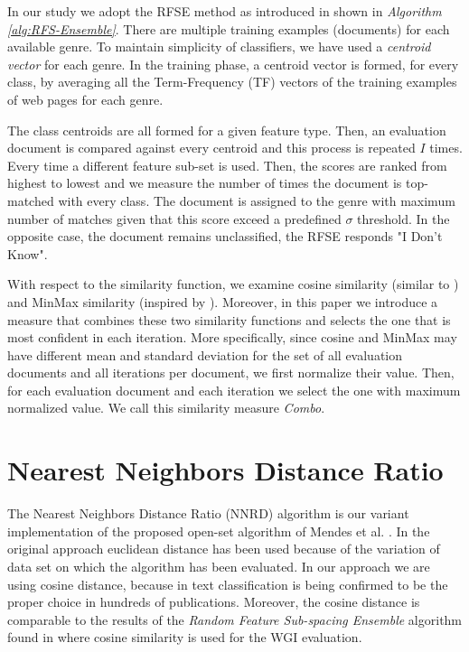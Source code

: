 \hfill \break

In our study we adopt the RFSE method as introduced in  shown in \textit{Algorithm \ref{alg:RFS-Ensemble}}. There are multiple training examples (documents) for each available genre. To maintain simplicity of classifiers, we have used a \textit{centroid vector} for each genre. In the training phase, a centroid vector is formed, for every class, by averaging all the Term-Frequency (TF) vectors of the training examples of web pages for each genre.

The class centroids are all formed for a given feature type. Then, an evaluation document is compared against every centroid and this process is repeated $I$ times. Every time a different feature sub-set is used. Then, the scores are ranked from highest to lowest and we measure the number of times the document is top-matched with every class. The document is assigned to the genre with maximum number of matches given that this score exceed a predefined $\sigma$ threshold. In the opposite case, the document remains unclassified, the RFSE responds "I Don't Know".


With respect to the similarity function, we examine cosine similarity (similar to ) and MinMax similarity (inspired by ). Moreover, in this paper we introduce a measure that combines these two similarity functions and selects the one that is most confident in each iteration. More specifically, since cosine and MinMax may have different mean and standard deviation for the set of all evaluation documents and all iterations per document, we first normalize their value. Then, for each evaluation document and each iteration we select the one with maximum normalized value. We call this similarity measure \textit{Combo}.

\section{Nearest Neighbors Distance Ratio}\label{sec:NNRD_Description}

The Nearest Neighbors Distance Ratio (NNRD) algorithm is our variant implementation of the proposed open-set algorithm of Mendes et al. \parencite{mendesjunior2016}. In the original approach euclidean distance has been used because of the variation of data set on which the algorithm has been evaluated. In our approach we are using cosine distance, because in text classification is being confirmed to be the proper choice in hundreds of publications. Moreover, the cosine distance is comparable to the results of the \textit{Random Feature Sub-spacing Ensemble} algorithm found in \parencite{pritsos2018open} where cosine similarity is used for the WGI evaluation.

